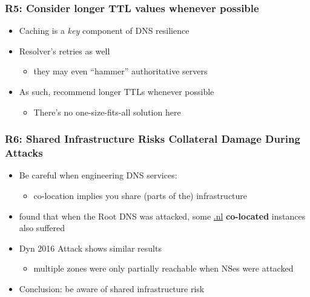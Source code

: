 \documentclass[11pt,show 
notes,notheorems,noamsthm,blank]{beamer} %
\begin{document}
\begin{frame}
 \frametitle{R5: Consider longer TTL values whenever 
possible}
\begin{itemize}
 
 
 \item Caching is a \textit{key} component of DNS resilience
 \item Resolver's retries as well 
\begin{itemize}
\item they may even ``hammer'' authoritative servers
\end{itemize}
   
 \item As such, \cite{Moura18b} recommend longer TTLs whenever possible
 \begin{itemize}
  \item There's no one-size-fits-all solution here
 \end{itemize}

 
 
 \end{itemize}
 
 
\end{frame}

\begin{frame}
 \frametitle{R6:  Shared Infrastructure Risks Collateral Damage During 
Attacks}
 \begin{itemize}
  \item Be careful when engineering DNS services:
  
  \begin{itemize}
   \item  co-location implies you share (parts of the) infrastructure
  \end{itemize}


\item \cite{Moura16b} found that when the Root DNS was attacked, some \url{.nl}
\textbf{co-located} instances also suffered
\item Dyn 2016 Attack shows similar results
\begin{itemize}
 \item multiple zones were only partially reachable 
when NSes were attacked
\end{itemize}


\item Conclusion: be aware of shared infrastructure risk
 \end{itemize}

\end{frame}
\end{document}
